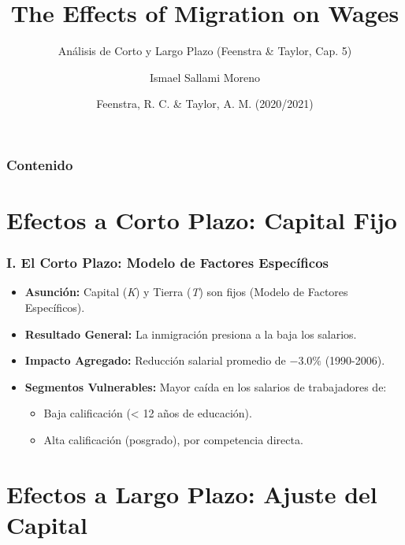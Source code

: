 \documentclass{beamer}
\title{The Effects of Migration on Wages}
\subtitle{Análisis de Corto y Largo Plazo (Feenstra \& Taylor, Cap. 5)}
\author{Ismael Sallami Moreno}
\institute{UGR}
\date{Feenstra, R. C. \& Taylor, A. M. (2020/2021)}
\begin{document}
\begin{frame}
\titlepage %
\end{frame}

\begin{frame}
\frametitle{Contenido}
\tableofcontents %
\end{frame}

\section{Efectos a Corto Plazo: Capital Fijo}

\begin{frame}
\frametitle{I. El Corto Plazo: Modelo de Factores Específicos}

\begin{itemize}
    \item \textbf{Asunción:} Capital (\textit{K}) y Tierra (\textit{T}) son fijos (Modelo de Factores Específicos).
    \item \textbf{Resultado General:} La inmigración presiona a la baja los salarios.
    \item \textbf{Impacto Agregado:} Reducción salarial promedio de \alert{\textbf{$-3.0\%$}} (1990-2006).
    \item \textbf{Segmentos Vulnerables:} Mayor caída en los salarios de trabajadores de:
        \begin{itemize}
            \item Baja calificación (< 12 años de educación).
            \item Alta calificación (posgrado), por competencia directa.
        \end{itemize}
\end{itemize}

\end{frame}

\section{Efectos a Largo Plazo: Ajuste del Capital}
\end{document}
